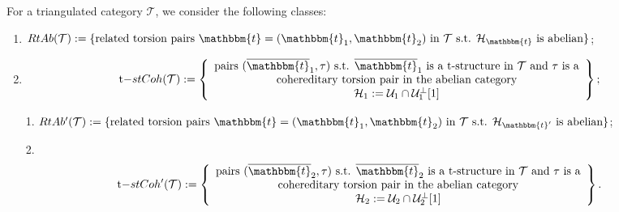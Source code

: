 \begin{definition}
  For a triangulated category $\mathcal{T}$, we consider the following classes:
  \begin{enumerate}
    \item $RtAb(\mathcal{T}):=\{\text{related torsion pairs }\mathbbm{t}=(\mathbbm{t}_1,\mathbbm{t}_2)
      \text{ in }\mathcal{T}\text{ s.t. }\mathcal{H}_\mathbbm{t}\text{ is abelian}\}$;
    \item
      \begin{align*}
        \mathrm{t-}stCoh(\mathcal{T}) &:=
        \left\{
        \begin{array}{c}
          \text{pairs }(\overline{\mathbbm{t}}_1,\tau)\text{ s.t. }
          \overline{\mathbbm{t}}_1\text{ is a t-structure in }\mathcal{T}\text{ and }
          \tau\text{ is a}\\
          \text{ cohereditary torsion pair in the abelian category } \\
          \mathcal{H}_1:=\mathcal{U}_1\cap\mathcal{U}_1^\perp[1]
        \end{array}
        \right\};
      \end{align*}
    \item[1\rlap{$^\prime$}.] $RtAb^\prime(\mathcal{T}):=\{\text{related torsion pairs }\mathbbm{t}=(\mathbbm{t}_1,\mathbbm{t}_2)
      \text{ in }\mathcal{T}\text{ s.t. }\mathcal{H}_{\mathbbm{t}'}\text{ is abelian}\}$;
    \item[2\rlap{$^\prime$}.]
      \begin{align*}
        \mathrm{t-}stCoh^\prime(\mathcal{T}) &:=
        \left\{
        \begin{array}{c}
          \text{pairs }(\overline{\mathbbm{t}}_2,\tau)\text{ s.t. }
          \overline{\mathbbm{t}}_2\text{ is a t-structure in }\mathcal{T}\text{ and }
          \tau\text{ is a}\\
          \text{ cohereditary torsion pair in the abelian category } \\
          \mathcal{H}_2:=\mathcal{U}_2\cap\mathcal{U}_2^\perp[1]
        \end{array}
        \right\}.
      \end{align*}
  \end{enumerate}
\end{definition}

